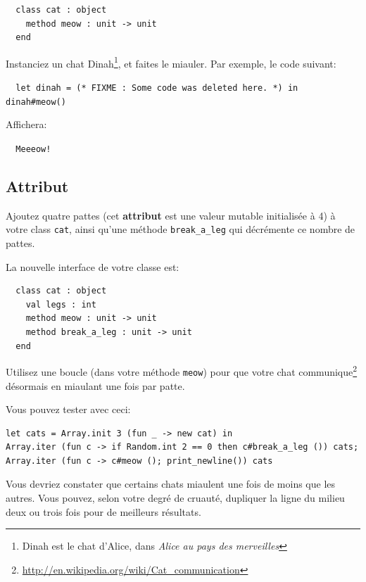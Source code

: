 \documentclass[a4paper]{article}
\begin{document}
\vspace{3mm}
\begin{verbatim}
  class cat : object
    method meow : unit -> unit
  end
\end{verbatim}
\vspace{3mm}

Instanciez un chat Dinah\footnote{Dinah est le chat d'Alice, dans \textit{Alice
au pays des merveilles}}, et faites le miauler. Par exemple, le code suivant:

\vspace{3mm}
\verb|  let dinah = (* FIXME : Some code was deleted here. *) in dinah#meow()|
\vspace{3mm}

Affichera:

\vspace{3mm}
\verb|  Meeeow!|
\vspace{3mm}

\subsection{Attribut}

Ajoutez quatre pattes (cet \textbf{attribut} est une valeur mutable initialisée
à 4) à votre class \verb|cat|, ainsi qu'une méthode \verb|break_a_leg| qui
décrémente ce nombre de pattes.

La nouvelle
interface de votre classe est:
\vspace{3mm}
\begin{verbatim}
  class cat : object
    val legs : int
    method meow : unit -> unit
    method break_a_leg : unit -> unit
  end
\end{verbatim}
\vspace{3mm}

Utilisez une boucle (dans votre méthode \verb|meow|) pour que votre chat
communique\footnote{\protect\url{http://en.wikipedia.org/wiki/Cat\_communication}}
désormais en miaulant une fois par patte.

\newpage

Vous pouvez tester avec ceci:

\begin{verbatim}
let cats = Array.init 3 (fun _ -> new cat) in
Array.iter (fun c -> if Random.int 2 == 0 then c#break_a_leg ()) cats;
Array.iter (fun c -> c#meow (); print_newline()) cats
\end{verbatim}

Vous devriez constater que certains chats miaulent une fois de moins que les
autres. Vous pouvez, selon votre degré de cruauté, dupliquer la ligne du milieu
deux ou trois fois pour de meilleurs résultats.
\end{document}
